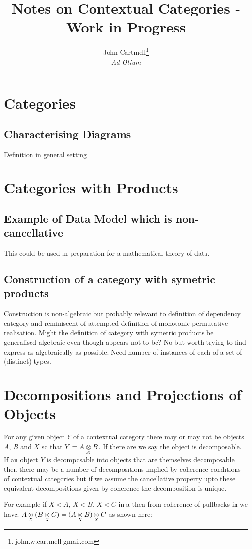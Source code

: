 \documentclass[10pt,a4paper]{scrartcl}
\title{Notes on Contextual Categories - Work in Progress}
\author{John Cartmell\footnote{john.w.cartmell gmail.com}\\ \normalsize{\textit{Ad Otium}}}
\begin{document}
\section{Categories}
\subsection{Characterising Diagrams}
Definition in general setting

\section{Categories with Products}

\subsection{Example of Data Model which is non-cancellative}
This could be used in preparation for a mathematical theory of data.
\subsection{Construction of a category with symetric products}
Construction is non-algebraic but probably relevant to definition of dependency category
and reminiscent of attempted definition of monotonic permutative realisation.
Might the definition of category with symetric products be generalised algebraic even though appears not to be? No but worth trying to find express as algebraically as possible. Need number of instances of each of a set of (distinct) types. 



\section{Decompositions and Projections of Objects}
For any given object $Y$ of a contextual category there may or may not be objects $A$, $B$ and $X$ so that
$Y = \crossx{A}{B}{X}$. If there are we say the object is decomposable. If an object $Y$ is decomposable into objects that
are themselves decomposable then there may be a number of decompositions implied by coherence conditions of contextual
categories but if we assume the cancellative property upto these equivalent decompositions given by coherence
the decomposition is unique. 

\noindent
For example if $X < A$, $X < B$, $X < C$ in a \ccat then from coherence of pullbacks in \ccat we have:
$\crossx{A}{(\crossx{B}{C}{X})}{X} = \crossx{(\crossx{A}{B}{X})}{C}{X}$ as shown here:
 
\end{document}
